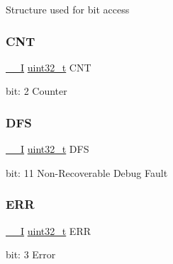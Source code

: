Structure used for bit access \mbox{\label{union_t_c_c___i_n_t_f_l_a_g___type_a5a2def14363813fcf6287e3edd1104bf}} 
\subsubsection{\texorpdfstring{CNT}{CNT}}
{\footnotesize\ttfamily \mbox{\hyperlink{core__cm0plus_8h_af63697ed9952cc71e1225efe205f6cd3}{\+\_\+\+\_\+I}} \mbox{\hyperlink{union_t_c_c___i_n_t_f_l_a_g___type_a7c2ec0f7b3f1314bdede58b182af397c}{uint32\+\_\+t}} C\+NT}

bit\+: 2 Counter \mbox{\label{union_t_c_c___i_n_t_f_l_a_g___type_a328dd9ae0b5ef735518f73db6d38fbf2}} 
\subsubsection{\texorpdfstring{DFS}{DFS}}
{\footnotesize\ttfamily \mbox{\hyperlink{core__cm0plus_8h_af63697ed9952cc71e1225efe205f6cd3}{\+\_\+\+\_\+I}} \mbox{\hyperlink{union_t_c_c___i_n_t_f_l_a_g___type_a7c2ec0f7b3f1314bdede58b182af397c}{uint32\+\_\+t}} D\+FS}

bit\+: 11 Non-\/\+Recoverable Debug Fault \mbox{\label{union_t_c_c___i_n_t_f_l_a_g___type_af6882b2088feac98419f8c0ae5ab32ea}} 
\subsubsection{\texorpdfstring{ERR}{ERR}}
{\footnotesize\ttfamily \mbox{\hyperlink{core__cm0plus_8h_af63697ed9952cc71e1225efe205f6cd3}{\+\_\+\+\_\+I}} \mbox{\hyperlink{union_t_c_c___i_n_t_f_l_a_g___type_a7c2ec0f7b3f1314bdede58b182af397c}{uint32\+\_\+t}} E\+RR}

bit\+: 3 Error \mbox{\label{union_t_c_c___i_n_t_f_l_a_g___type_ae0bc28ffe5063b144efb7230dfbcaf5d}} 

